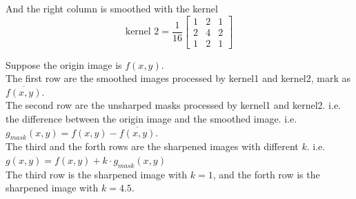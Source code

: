 And the right column is smoothed with the kernel
$$\text{kernel\ 2}=\dfrac{1}{16}\begin{bmatrix}1 & 2 & 1\\2 & 4 & 2\\1 & 2 & 1\end{bmatrix}$$

Suppose the origin image is $f(x,y)$.\\
The first row are the smoothed images processed by kernel1 and kernel2, mark as $\overline{f(x,y)}$.\\
The second row are the unsharped masks processed by kernel1 and kernel2. i.e. the difference between the
origin image and the smoothed image. i.e. $g_{mask}(x,y)=f(x,y)-\overline{f(x,y)}$.\\
The third and the forth rows are the sharpened images with different $k$. i.e. $g(x,y)=f(x,y)+k\cdot g_{mask}(x,y)$\\
The third row is the sharpened image with $k=1$, and the forth row is the sharpened image with $k=4.5$.\\

